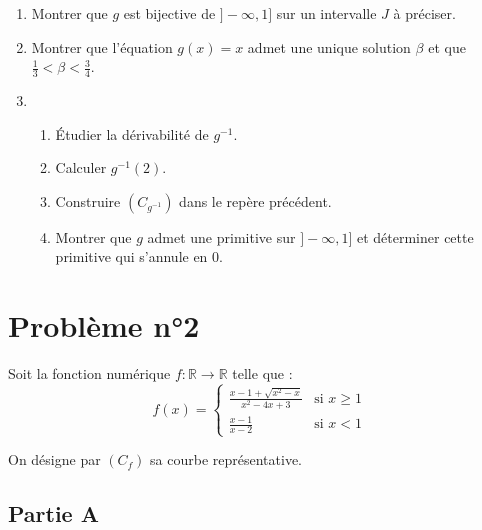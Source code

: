 \documentclass[12pt]{article}
\begin{document}
\begin{enumerate}
    \item Montrer que \( g \) est bijective de \( ] -\infty, 1] \) sur un intervalle \( J \) à préciser.
    \item Montrer que l’équation \( g(x) = x \) admet une unique solution \( \beta \) et que \( \frac{1}{3} < \beta < \frac{3}{4} \).
    \item 
    \begin{enumerate}
        \item Étudier la dérivabilité de \( g^{-1} \).
        \item Calculer \( g^{-1}(2) \).
        \item Construire \( (C_{g^{-1}}) \) dans le repère précédent.
        \item Montrer que \( g \) admet une primitive sur \( ] -\infty, 1] \) et déterminer cette primitive qui s’annule en 0.
    \end{enumerate}
\end{enumerate}
\section*{Problème n°2}

Soit la fonction numérique \( f : \mathbb{R} \to \mathbb{R} \) telle que :
\[
f(x) = 
\begin{cases} 
\frac{x - 1 + \sqrt{x^2 - x}}{x^2 - 4x + 3} & \text{si } x \geq 1 \\
\frac{x - 1}{x - 2} & \text{si } x < 1 
\end{cases}
\]

On désigne par \( (C_f) \) sa courbe représentative.

\subsection*{Partie A}
\end{document}
